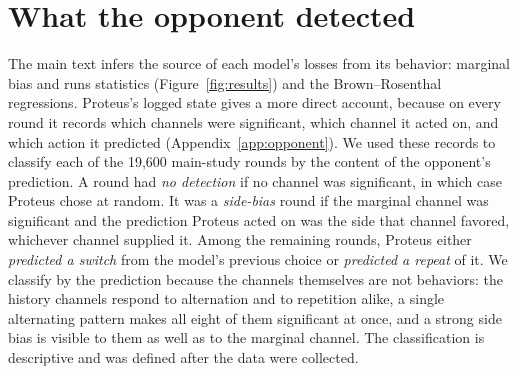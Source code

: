 \setcounter{section}{10}
\section{What the opponent detected}\label{app:detection}\setcounter{table}{0}\setcounter{figure}{0}

The main text infers the source of each model's losses from its behavior: marginal bias and runs statistics (Figure~\ref{fig:results}) and the Brown--Rosenthal regressions. Proteus's logged state gives a more direct account, because on every round it records which channels were significant, which channel it acted on, and which action it predicted (Appendix~\ref{app:opponent}). We used these records to classify each of the 19,600 main-study rounds by the content of the opponent's prediction. A round had \emph{no detection} if no channel was significant, in which case Proteus chose at random. It was a \emph{side-bias} round if the marginal channel was significant and the prediction Proteus acted on was the side that channel favored, whichever channel supplied it. Among the remaining rounds, Proteus either \emph{predicted a switch} from the model's previous choice or \emph{predicted a repeat} of it. We classify by the prediction because the channels themselves are not behaviors: the history channels respond to alternation and to repetition alike, a single alternating pattern makes all eight of them significant at once, and a strong side bias is visible to them as well as to the marginal channel. The classification is descriptive and was defined after the data were collected.

